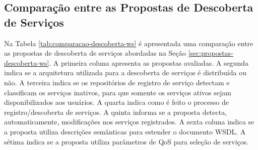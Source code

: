 \subsection{Comparação entre as Propostas de Descoberta de Serviços}

Na Tabela \ref{tab:comparacao-descoberta-ws} é apresentada uma comparação entre as propostas de descoberta de serviços abordadas na Seção \ref{sec:propostas-descoberta-ws}. A primeira coluna apresenta as propostas avaliadas. A segunda indica se a arquitetura utilizada para a descoberta de serviços é distribuída ou não. A terceira indica se os repositórios de registro de serviço detectam e classificam os serviços inativos, para que somente os serviços ativos sejam disponibilizados aos usuários. A quarta indica como é feito o processo de registro/descoberta de serviços. A quinta informa se a proposta detecta, automaticamente, modificações nos serviços registrados. A sexta coluna indica se a proposta utiliza descrições semânticas para estender
o documento WSDL. A sétima indica se a proposta utiliza parâmetros de QoS para seleção de serviços.

